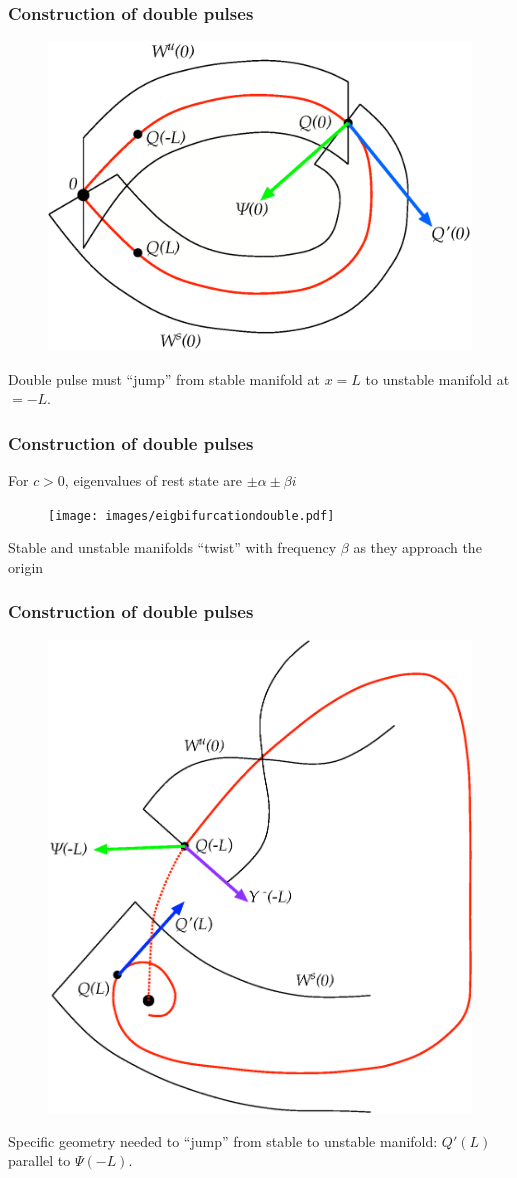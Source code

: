 \documentclass[16pt]{beamer}
\begin{document}
\begin{frame}
	\frametitle{Construction of double pulses}
	\fontsize{16}{7.2}\selectfont
	\begin{figure}
	\begin{center}
	\includegraphics[width=0.6\linewidth]{images/WsWu}
	\end{center}
	\end{figure}
	Double pulse must ``jump'' from stable manifold at $x = L$ to unstable manifold at $ = -L$.
\end{frame}

\begin{frame}
	\frametitle{Construction of double pulses}
	\fontsize{16}{7.2}\selectfont
	For $c > 0$, eigenvalues of rest state are $\pm \alpha \pm \beta i$
	\begin{figure}
	\begin{center}
	\texttt{[image: images/eigbifurcationdouble.pdf]}
	\end{center}
	\end{figure}
	Stable and unstable manifolds ``twist'' with frequency $\beta$ as they approach the origin
\end{frame}

\begin{frame}
	\frametitle{Construction of double pulses}
	\fontsize{16}{7.2}\selectfont
	\begin{figure}
	\begin{center}
	\includegraphics[width=0.45\linewidth]{images/manifoldslineup}
	\end{center}
	\end{figure}
	Specific geometry needed to ``jump'' from stable to unstable manifold: $Q'(L)$ parallel to $\Psi(-L)$.
\end{frame}
\end{document}
